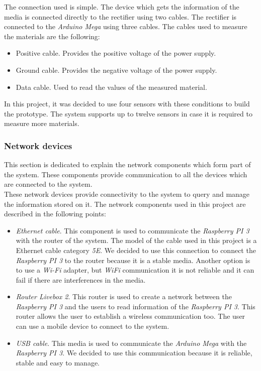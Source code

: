 The connection used is simple. The device which gets the information of the media is connected directly to the rectifier using two cables. The rectifier is connected to the \textit{Arduino Mega} using three cables. The cables used to measure the materials are the following:

\begin{itemize}

\item Positive cable. Provides the positive voltage of the power supply.
\item Ground cable. Provides the negative voltage of the power supply.
\item Data cable. Used to read the values of the measured material.

\end{itemize}

In this project, it was decided to use four sensors with these conditions to build the prototype. The system supports up to twelve sensors in case it is required to measure more materials.

\subsubsection{Network devices}

This section is dedicated to explain the network components which form part of the system. These components provide communication to all the devices which are connected to the system.\\ 

These network devices provide connectivity to the system to query and manage the information stored on it. The network components used in this project are described in the following points:\\

\begin{itemize}

\item \textit{Ethernet cable}. This component is used to communicate the \textit{Raspberry PI 3} with the router of the system. The model of the cable used in this project is a Ethernet cable category \textit{5E}. We decided to use this connection to connect the \textit{Raspberry PI 3} to the router because it is a stable media. Another option is to use a \textit{Wi-Fi} adapter, but \textit{WiFi} communication it is not reliable and it can fail if there are interferences in the media.

\item \textit{Router Livebox 2}. This router is used to create a network between the \textit{Raspberry PI 3} and the users to read information of the \textit{Raspberry PI 3}. This router allows the user to establish a wireless communication too. The user can use a mobile device to connect to the system.

\item \textit{USB cable}. This media is used to communicate the \textit{Arduino Mega} with the \textit{Raspberry PI 3}. We decided to use this communication because it is reliable, stable and easy to manage.

\end{itemize}

